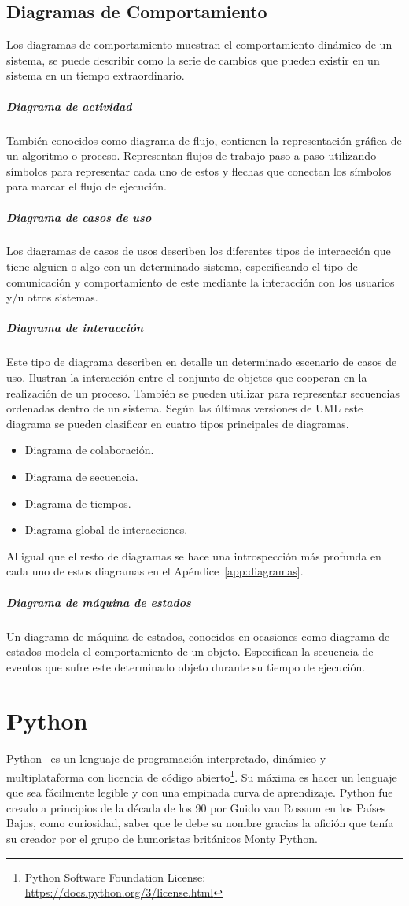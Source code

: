 \documentclass[a4paper, 12pt]{book}
\begin{document}
\subsection{Diagramas de Comportamiento}
Los diagramas de comportamiento muestran el comportamiento dinámico de un sistema, se puede describir como la serie de cambios que pueden existir en un sistema en un tiempo extraordinario.  
\subparagraph{Diagrama de actividad}
También conocidos como diagrama de flujo, contienen la representación gráfica de un algoritmo o proceso. Representan flujos de trabajo paso a paso utilizando símbolos para representar cada uno de estos y flechas que conectan los símbolos para marcar el flujo de ejecución. 
\subparagraph{Diagrama de casos de uso}
Los diagramas de casos de usos describen los diferentes tipos de interacción que tiene alguien o algo con un determinado sistema, especificando el tipo de comunicación y comportamiento de este mediante la interacción con los usuarios y/u otros sistemas.
\subparagraph{Diagrama de interacción}
Este tipo de diagrama describen en detalle un determinado escenario de casos de uso. Ilustran la interacción entre el conjunto de objetos que cooperan en la realización de un proceso. También se pueden utilizar para representar secuencias ordenadas dentro de un sistema. Según las últimas versiones de UML este diagrama se pueden clasificar en cuatro tipos principales de diagramas. 
\begin{itemize}
	\item Diagrama de colaboración. 
	\item Diagrama de secuencia. 
	\item Diagrama de tiempos. 
	\item Diagrama global de interacciones.  
\end{itemize}
Al igual que el resto de diagramas se hace una introspección más profunda en cada uno de estos diagramas en el Apéndice~\ref{app:diagramas}.
\subparagraph{Diagrama de máquina de estados}
Un diagrama de máquina de estados, conocidos en ocasiones como diagrama de estados modela el comportamiento de un objeto. Especifican la secuencia de eventos que sufre este determinado objeto durante su tiempo de ejecución. 

\section{Python}
\label{sec:python}
Python~\cite{python} es un lenguaje de programación interpretado, dinámico y multiplataforma con licencia de código abierto\footnote{Python Software Foundation License: \url{https://docs.python.org/3/license.html}}. Su máxima es hacer un lenguaje que sea fácilmente legible y con una empinada curva de aprendizaje. Python fue creado a principios de la década de los 90 por Guido van Rossum en los Países Bajos, como curiosidad, saber que le debe su nombre gracias la afición que tenía su creador por el grupo de humoristas británicos Monty Python. 
\end{document}
